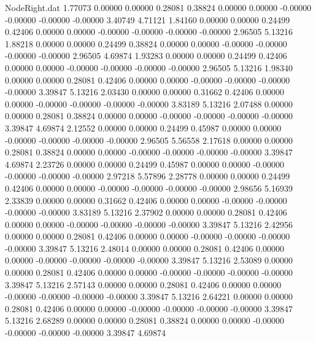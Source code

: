 \begin{filecontents}{NodeRight.dat}
   1.77073    0.00000    0.00000     0.28081    0.38824    0.00000    0.00000   -0.00000   -0.00000   -0.00000   -0.00000    3.40749    4.71121
   1.84160    0.00000    0.00000     0.24499    0.42406    0.00000    0.00000   -0.00000   -0.00000   -0.00000   -0.00000    2.96505    5.13216
   1.88218    0.00000    0.00000     0.24499    0.38824    0.00000    0.00000   -0.00000   -0.00000   -0.00000   -0.00000    2.96505    4.69874
   1.93283    0.00000    0.00000     0.24499    0.42406    0.00000    0.00000   -0.00000   -0.00000   -0.00000   -0.00000    2.96505    5.13216
   1.98340    0.00000    0.00000     0.28081    0.42406    0.00000    0.00000   -0.00000   -0.00000   -0.00000   -0.00000    3.39847    5.13216
   2.03430    0.00000    0.00000     0.31662    0.42406    0.00000    0.00000   -0.00000   -0.00000   -0.00000   -0.00000    3.83189    5.13216
   2.07488    0.00000    0.00000     0.28081    0.38824    0.00000    0.00000   -0.00000   -0.00000   -0.00000   -0.00000    3.39847    4.69874
   2.12552    0.00000    0.00000     0.24499    0.45987    0.00000    0.00000   -0.00000   -0.00000   -0.00000   -0.00000    2.96505    5.56558
   2.17618    0.00000    0.00000     0.28081    0.38824    0.00000    0.00000   -0.00000   -0.00000   -0.00000   -0.00000    3.39847    4.69874
   2.23726    0.00000    0.00000     0.24499    0.45987    0.00000    0.00000   -0.00000   -0.00000   -0.00000   -0.00000    2.97218    5.57896
   2.28778    0.00000    0.00000     0.24499    0.42406    0.00000    0.00000   -0.00000   -0.00000   -0.00000   -0.00000    2.98656    5.16939
   2.33839    0.00000    0.00000     0.31662    0.42406    0.00000    0.00000   -0.00000   -0.00000   -0.00000   -0.00000    3.83189    5.13216
   2.37902    0.00000    0.00000     0.28081    0.42406    0.00000    0.00000   -0.00000   -0.00000   -0.00000   -0.00000    3.39847    5.13216
   2.42956    0.00000    0.00000     0.28081    0.42406    0.00000    0.00000   -0.00000   -0.00000   -0.00000   -0.00000    3.39847    5.13216
   2.48014    0.00000    0.00000     0.28081    0.42406    0.00000    0.00000   -0.00000   -0.00000   -0.00000   -0.00000    3.39847    5.13216
   2.53089    0.00000    0.00000     0.28081    0.42406    0.00000    0.00000   -0.00000   -0.00000   -0.00000   -0.00000    3.39847    5.13216
   2.57143    0.00000    0.00000     0.28081    0.42406    0.00000    0.00000   -0.00000   -0.00000   -0.00000   -0.00000    3.39847    5.13216
   2.64221    0.00000    0.00000     0.28081    0.42406    0.00000    0.00000   -0.00000   -0.00000   -0.00000   -0.00000    3.39847    5.13216
   2.68289    0.00000    0.00000     0.28081    0.38824    0.00000    0.00000   -0.00000   -0.00000   -0.00000   -0.00000    3.39847    4.69874

\end{filecontents}
